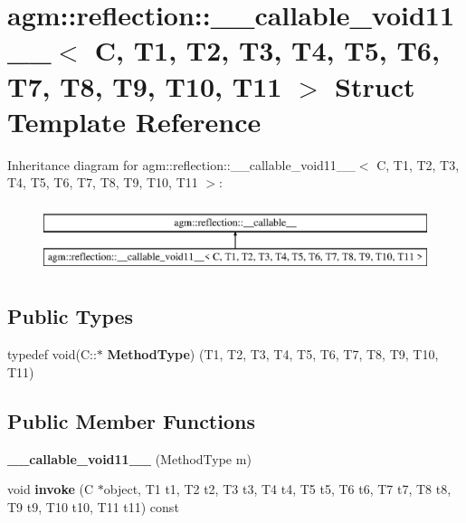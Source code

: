 \hypertarget{structagm_1_1reflection_1_1____callable__void11____}{}\section{agm\+:\+:reflection\+:\+:\+\_\+\+\_\+callable\+\_\+void11\+\_\+\+\_\+$<$ C, T1, T2, T3, T4, T5, T6, T7, T8, T9, T10, T11 $>$ Struct Template Reference}
\label{structagm_1_1reflection_1_1____callable__void11____}
Inheritance diagram for agm\+:\+:reflection\+:\+:\+\_\+\+\_\+callable\+\_\+void11\+\_\+\+\_\+$<$ C, T1, T2, T3, T4, T5, T6, T7, T8, T9, T10, T11 $>$\+:\begin{figure}[H]
\begin{center}
\leavevmode
\includegraphics[height=2.000000cm]{structagm_1_1reflection_1_1____callable__void11____}
\end{center}
\end{figure}
\subsection*{Public Types}
\begin{DoxyCompactItemize}
\item 
typedef void(C\+::$\ast$ {\bfseries Method\+Type}) (T1, T2, T3, T4, T5, T6, T7, T8, T9, T10, T11)\hypertarget{structagm_1_1reflection_1_1____callable__void11_____abc4520cdd7449b61cc7ac63b83050960}{}\label{structagm_1_1reflection_1_1____callable__void11_____abc4520cdd7449b61cc7ac63b83050960}

\end{DoxyCompactItemize}
\subsection*{Public Member Functions}
\begin{DoxyCompactItemize}
\item 
{\bfseries \+\_\+\+\_\+callable\+\_\+void11\+\_\+\+\_\+} (Method\+Type m)\hypertarget{structagm_1_1reflection_1_1____callable__void11_____af37318e7547a05ae6b211b8ad89b65bd}{}\label{structagm_1_1reflection_1_1____callable__void11_____af37318e7547a05ae6b211b8ad89b65bd}

\item 
void {\bfseries invoke} (C $\ast$object, T1 t1, T2 t2, T3 t3, T4 t4, T5 t5, T6 t6, T7 t7, T8 t8, T9 t9, T10 t10, T11 t11) const \hypertarget{structagm_1_1reflection_1_1____callable__void11_____a948eca5d4eab2e8305f2afb53a63bd01}{}\label{structagm_1_1reflection_1_1____callable__void11_____a948eca5d4eab2e8305f2afb53a63bd01}

\end{DoxyCompactItemize}
